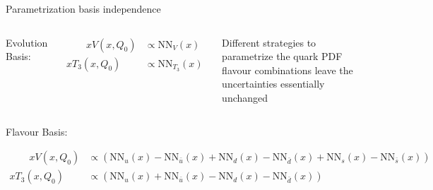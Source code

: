 \documentclass[aspectratio=169,9pt]{beamer}
\begin{document}
\begin{frame}{Parametrization basis independence}
\begin{columns}
    \end{columns}
    \begin{columns}
		    Evolution Basis:
		    {\footnotesize
		    \begin{fleqn}
		    \begin{align*}
		       \qquad x V\left(x, Q_{0}\right) &\propto \mathrm{NN}_{V}(x)\\
		        x T_{3}\left(x, Q_{0}\right) &\propto \mathrm{NN}_{T_{3}}(x)
		    \end{align*}
		    \end{fleqn}
		    }
            \begin{block}{}
                Different strategies to parametrize the quark PDF flavour combinations leave the uncertainties essentially unchanged
            \end{block}
    \end{columns}
    \vspace*{-0.5em}
    Flavour Basis:
    {\footnotesize
    \begin{fleqn}
    \begin{align*}
        \qquad x V\left(x, Q_{0}\right) &\propto\left(\mathrm{NN}_{u}(x)-\mathrm{NN}_{\bar{u}}(x)+\mathrm{NN}_{d}(x)-\mathrm{NN}_{\bar{d}}(x)+\mathrm{NN}_{s}(x)-\mathrm{NN}_{\bar{s}}(x)\right) \\
        x T_{3}\left(x, Q_{0}\right) &\propto\left(\mathrm{NN}_{u}(x)+\mathrm{NN}_{\bar{u}}(x)-\mathrm{NN}_{d}(x)-\mathrm{NN}_{\bar{d}}(x)\right)
    \end{align*}
    \end{fleqn}
    }
\end{frame}
\end{document}

